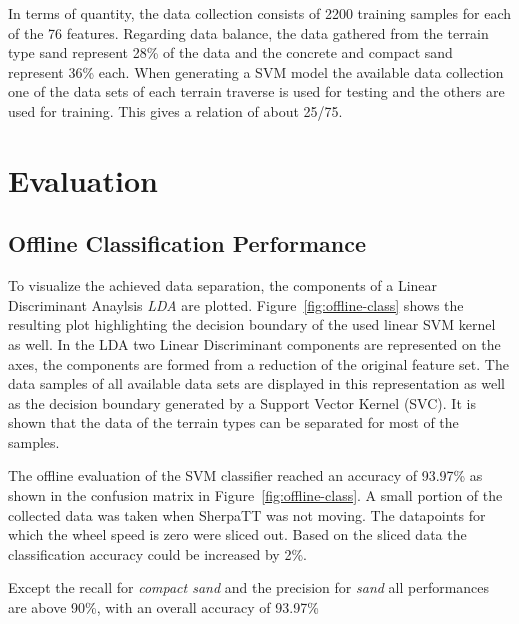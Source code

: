 \documentclass{article}
\begin{document}
In terms of quantity, the data collection consists of 2200 training samples for each of the 76 features. Regarding data balance, the data gathered from the terrain type sand represent 28\% of the data and the concrete and compact sand represent 36\% each. 
When generating a SVM model the available data collection one of the data sets of each terrain traverse is used for testing and the others are used for training. This gives a relation of about 25/75.

\section{Evaluation}
\subsection{Offline Classification Performance}

To visualize the achieved data separation, the components of a Linear Discriminant Anaylsis \emph{LDA} are plotted. 
Figure~\ref{fig:offline-class} shows the resulting plot highlighting the decision boundary of the used linear SVM kernel as well. In the LDA two Linear Discriminant components are represented on the axes, the components are formed from a reduction of the original feature set. The data samples of all available data sets are displayed in this representation as well as the decision boundary generated by a Support Vector Kernel (SVC). It is shown that the data of the terrain types can be separated for most of the samples.

The offline evaluation of the SVM classifier reached an accuracy of 93.97\% as shown in the confusion matrix in Figure~\ref{fig:offline-class}. A small portion of the collected data was taken when SherpaTT was not moving. The datapoints for which the wheel speed is zero were sliced out. Based on the sliced data the classification accuracy could be increased by 2\%.

Except the recall for \emph{compact sand} and the precision for \emph{sand} all performances are above 90\%, with an overall accuracy of 93.97\%

\end{document}
